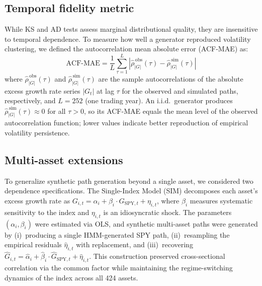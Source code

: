 \subsection*{Temporal fidelity metric}
While KS and AD tests assess marginal distributional quality, they are insensitive to temporal dependence. To measure how well a generator reproduced volatility clustering, we defined the autocorrelation mean absolute error (ACF-MAE) as:
\begin{equation}
    \text{ACF-MAE} = \frac{1}{L}\sum_{\tau=1}^{L} \left\lvert \widehat{\rho}_{|G|}^{\,\text{obs}}(\tau) - \widehat{\rho}_{|G|}^{\,\text{sim}}(\tau) \right\rvert
    \label{eq:acf_mae}
\end{equation}
where $\widehat{\rho}_{|G|}^{\,\text{obs}}(\tau)$ and $\widehat{\rho}_{|G|}^{\,\text{sim}}(\tau)$ are the sample autocorrelations of the absolute excess growth rate series $|G_t|$ at lag $\tau$ for the observed and simulated paths, respectively, and $L=252$ (one trading year). An i.i.d.\ generator produces $\widehat{\rho}_{|G|}^{\,\text{sim}}(\tau)\approx 0$ for all $\tau>0$, so its ACF-MAE equals the mean level of the observed autocorrelation function; lower values indicate better reproduction of empirical volatility persistence.

\subsection*{Multi-asset extensions}
To generalize synthetic path generation beyond a single asset, we considered two dependence specifications. The Single-Index Model (SIM) \cite{sharpe_simplified_1963} decomposes each asset's excess growth rate as $G_{i,t} = \alpha_i + \beta_i \cdot G_{\text{SPY},t} + \eta_{i,t}$, where $\beta_i$ measures systematic sensitivity to the index and $\eta_{i,t}$ is an idiosyncratic shock. The parameters $(\alpha_i, \beta_i)$ were estimated via OLS, and synthetic multi-asset paths were generated by (i)~producing a single HMM-generated SPY path, (ii)~resampling the empirical residuals $\hat{\eta}_{i,t}$ with replacement, and (iii)~recovering $\hat{G}_{i,t} = \hat{\alpha}_i + \hat{\beta}_i \cdot \hat{G}_{\text{SPY},t} + \hat{\eta}_{i,t}$. This construction preserved cross-sectional correlation via the common factor while maintaining the regime-switching dynamics of the index across all 424 assets.

